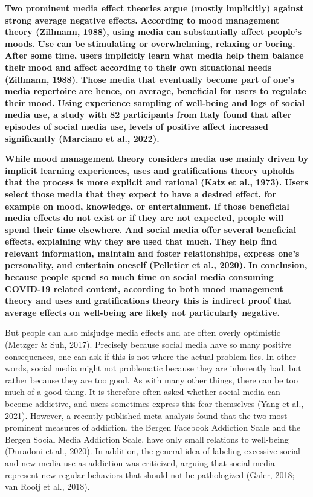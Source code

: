 \documentclass[
  man,mask]{apa7}
\begin{document}
\textbf{Two prominent media effect theories argue (mostly implicitly) against strong average negative effects.}
\textbf{According to mood management theory (Zillmann, 1988), using media can substantially affect people's moods.}
\textbf{Use can be stimulating or overwhelming, relaxing or boring.}
\textbf{After some time, users implicitly learn what media help them balance their mood and affect according to their own situational needs (Zillmann, 1988).}
\textbf{Those media that eventually become part of one's media repertoire are hence, on average, beneficial for users to regulate their mood.}
\textbf{Using experience sampling of well-being and logs of social media use, a study with 82 participants from Italy found that after episodes of social media use, levels of positive affect increased significantly (Marciano et al., 2022).}

\textbf{While mood management theory considers media use mainly driven by implicit learning experiences, uses and gratifications theory upholds that the process is more explicit and rational (Katz et al., 1973).}
\textbf{Users select those media that they expect to have a desired effect, for example on mood, knowledge, or entertainment.}
\textbf{If those beneficial media effects do not exist or if they are not expected, people will spend their time elsewhere.}
\textbf{And social media offer several beneficial effects, explaining why they are used that much.}
\textbf{They help find relevant information, maintain and foster relationships, express one's personality, and entertain oneself (Pelletier et al., 2020).}
\textbf{In conclusion, because people spend so much time on social media consuming COVID-19 related content, according to both mood management theory and uses and gratifications theory this is indirect proof that average effects on well-being are likely not particularly negative.}

But people can also misjudge media effects and are often overly optimistic (Metzger \& Suh, 2017).
Precisely because social media have so many positive consequences, one can ask if this is not where the actual problem lies.
In other words, social media might not problematic because they are inherently bad, but rather because they are too good.
As with many other things, there can be too much of a good thing.
It is therefore often asked whether social media can become addictive, and users sometimes express this fear themselves (Yang et al., 2021).
However, a recently published meta-analysis found that the two most prominent measures of addiction, the Bergen Facebook Addiction Scale and the Bergen Social Media Addiction Scale, have only small relations to well-being (Duradoni et al., 2020).
In addition, the general idea of labeling excessive social and new media use as addiction was criticized, arguing that social media represent new regular behaviors that should not be pathologized (Galer, 2018; van Rooij et al., 2018).
\end{document}
